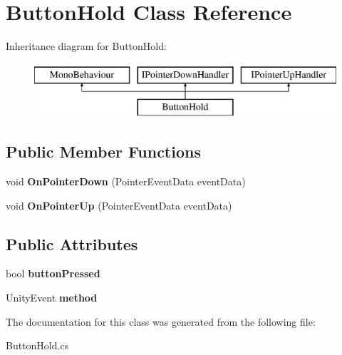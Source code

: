 \hypertarget{class_button_hold}{}\section{Button\+Hold Class Reference}
\label{class_button_hold}
Inheritance diagram for Button\+Hold\+:\begin{figure}[H]
\begin{center}
\leavevmode
\includegraphics[height=2.000000cm]{class_button_hold}
\end{center}
\end{figure}
\subsection*{Public Member Functions}
\begin{DoxyCompactItemize}
\item 
\mbox{\label{class_button_hold_a2e1f8ebf88714ea3e86261ef811c9941}} 
void {\bfseries On\+Pointer\+Down} (Pointer\+Event\+Data event\+Data)
\item 
\mbox{\label{class_button_hold_a2512c68bf1ec55d4bae22da5ef7ed66a}} 
void {\bfseries On\+Pointer\+Up} (Pointer\+Event\+Data event\+Data)
\end{DoxyCompactItemize}
\subsection*{Public Attributes}
\begin{DoxyCompactItemize}
\item 
\mbox{\label{class_button_hold_a9855cab98cfb77aee35a1cf117be20ef}} 
bool {\bfseries button\+Pressed}
\item 
\mbox{\label{class_button_hold_a45f8cc4d6c22a20d71717b00d3087fd4}} 
Unity\+Event {\bfseries method}
\end{DoxyCompactItemize}


The documentation for this class was generated from the following file\+:\begin{DoxyCompactItemize}
\item 
Button\+Hold.\+cs\end{DoxyCompactItemize}
